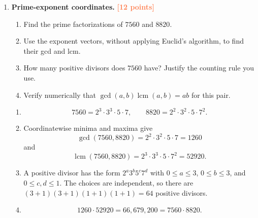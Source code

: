 \documentclass[11pt]{article}
\newcommand{\points}[1]{\hfill\textcolor{coral}{\small\bfseries[#1 points]}}
\begin{document}
\begin{enumerate}[resume]
\item \textbf{Prime-exponent coordinates.} \points{12}
\begin{enumerate}
  \item Find the prime factorizations of $7560$ and $8820$.
  \item Use the exponent vectors, without applying Euclid's algorithm, to find
  their gcd and lcm.
  \item How many positive divisors does $7560$ have? Justify the counting rule
  you use.
  \item Verify numerically that
  $\gcd(a,b)\operatorname{lcm}(a,b)=ab$ for this pair.
\end{enumerate}
\begin{solution}
\begin{enumerate}
  \item
  \[
    7560=2^3\cdot3^3\cdot5\cdot7,
    \qquad
    8820=2^2\cdot3^2\cdot5\cdot7^2.
  \]
  \item Coordinatewise minima and maxima give
  \[
  \gcd(7560,8820)=2^2\cdot3^2\cdot5\cdot7=1260
  \]
  and
  \[
  \operatorname{lcm}(7560,8820)=2^3\cdot3^3\cdot5\cdot7^2=52920.
  \]
  \item A positive divisor has the form $2^a3^b5^c7^d$ with
  $0\le a\le3$, $0\le b\le3$, and $0\le c,d\le1$. The choices are
  independent, so there are
  $(3+1)(3+1)(1+1)(1+1)=64$ positive divisors.
  \item
  \[
    1260\cdot52920=66{,}679{,}200
    =7560\cdot8820.
  \]
\end{enumerate}
\end{solution}


\end{enumerate}
\end{document}
